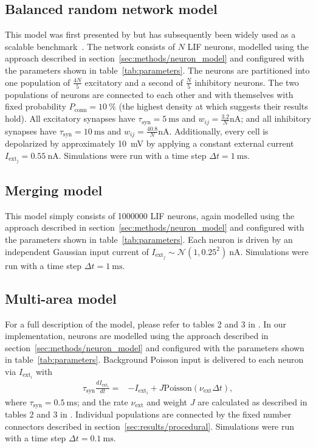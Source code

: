 \documentclass[9pt,a4paper]{amsart}
\begin{document}
\subsection{Balanced random network model}
\label{sec:methods/va_benchmark}
This model was first presented by \citet{Vogels2005} but has subsequently been widely used as a scalable benchmark~\citep{Brette2007}.
The network consists of $N$ LIF neurons, modelled using the approach described in section~\ref{sec:methods/neuron_model} and configured with the parameters shown in table~\ref{tab:parameters}.
The neurons are partitioned into one population of $\frac{4N}{5}$ excitatory and a second of $\frac{N}{5}$ inhibitory neurons.
The two populations of neurons are connected to each other and with themselves with fixed probability $P_{\text{conn}}=\SI{10}{\percent}$ (the highest density at which \citet{Vogels2005} suggests their results hold).
All excitatory synapses have $\tau_{\text{syn}}=\SI{5}{\milli\second}$ and $w_{ij}=\frac{3.2}{N}\si{\nano\ampere}$; and all inhibitory synapses have $\tau_{\text{syn}}=\SI{10}{\milli\second}$ and $w_{ij}=\frac{40.8}{N}\si{\nano\ampere}$.
Additionally, every cell is depolarized by approximately \SI{10}{\milli\volt} by applying a constant external current $I_{\text{ext}_j}= \SI{0.55}{\nano\ampere}$.
Simulations were run with a time step $\Delta t = \SI{1}{\milli\second}$.

\subsection{Merging model}
\label{sec:methods/merging}
This model simply consists of \num{1000000} LIF neurons, again modelled using the approach described in section~\ref{sec:methods/neuron_model} and configured with the parameters shown in table~\ref{tab:parameters}. 
Each neuron is driven by an independent Gaussian input current of $I_{\text{ext}_j} \sim \mathcal{N}(1, 0.25^2)\SI{}{\nano\ampere}$.
Simulations were run with a time step $\Delta t = \SI{1}{\milli\second}$.

\subsection{Multi-area model}
\label{sec:methods/multi_area_model}
For a full description of the model, please refer to tables 2 and 3 in \citet{Schmidt2018}.
In our implementation, neurons are modelled using the approach described in section~\ref{sec:methods/neuron_model} and configured with the parameters shown in table~\ref{tab:parameters}.
Background Poisson input is delivered to each neuron via $I_{\text{ext}_{i}}$ with
%
\begin{align}
    \tau_{\text{syn}} \frac{dI_{\text{ext}_{i}}}{dt} = & -I_{\text{ext}_{i}} + J \text{Poisson}(\nu_{\text{ext}} \Delta t),
\end{align}
%
where $\tau_{\text{syn}}=\SI{0.5}{\milli\second}$; and the rate $\nu_{\text{ext}}$ and weight $J$ are calculated as described in tables 2 and 3 in \citet{Schmidt2018}.
Individual populations are connected by the fixed number connectors described in section~\ref{sec:results/procedural}.
Simulations were run with a time step $\Delta t = \SI{0.1}{\milli\second}$.
\end{document}
